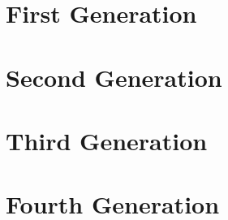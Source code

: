 \documentclass[ebook]{memoir}
\begin{document}
\begin{KeepFromToc}
\tableofcontents
\end{KeepFromToc}

\cleardoublepage

\listoffigures

\cleardoublepage



%


\mainmatter
% 



\chapter{First Generation}


\chapter{Second Generation}






\chapter{Third Generation}








\chapter{Fourth Generation}

















\appendix
\renewcommand{\chaptername}{Appendix}


\end{document}
